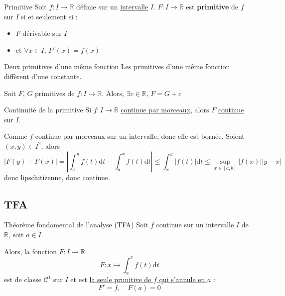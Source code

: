\begin{Definition}[colbacktitle=red!75!black]{Primitive}{}
Soit $f : I \to \mathbb{R}$ définie sur un \underline{intervalle} $I$. $F : I \to \mathbb{R}$ est \textbf{primitive} de $f$ sur $I$ si et seulement si :
\begin{itemize}

    \item $F$ dérivable sur $I$ 
    \item et $\forall x \in I$, $F'(x) = f(x)$

\end{itemize}
\end{Definition}

\begin{Prop}{Deux primitives d'une même fonction}{}
  Les primitives d'une même fonction diffèrent d'une constante.

Soit $F$, $G$ primitives de $f : I \to \mathbb{R}$. Alors, $\exists c \in \mathbb{R}$, $F = G + c$
\end{Prop}

\begin{Lenma}{Continuité de la primitive}{}
Si $f : I \to \mathbb{R}$ \underline{continue par morceaux}, alors $F$ \underline{continue} sur $I$.
\end{Lenma}

\begin{myproof}{}{}
  Comme $f$ continue par morceaux sur un intervalle, donc elle est bornée.
Soient $(x, y) \in I ^{2}$, alors 
\begin{equation}
  |F(y) - F(x) | = \left| \int_{a}^{y} f(t) \mathrm{d} t - \int_{a}^{x} f(t) \mathrm{d} t \right| \le \int_{x}^{y} |f(t) | \mathrm{d} t \le \sup _{x \in [a,b]} |f(x)| |y-x|
\end{equation}
donc lipschitizenne, donc continue.
\end{myproof}

\subsection{TFA} %
\label{sub:TFA}

\begin{Theorem}{\color{red} Théorème fondamental de l'analyse (TFA)}{}
Soit $f$ continue sur un intervalle $I$ de $\mathbb{R}$, soit $a \in I$. 

Alors, la fonction $F : I \to \mathbb{R}$
\begin{equation}
  F : x \mapsto \int_{a}^{x} f(t) \mathrm{d}t
\end{equation}
est de classe $\mathscr{C} ^{1}$ sur $I$ et est \underline{la seule primitive de $f$ qui s'annule en $a$} : 
\begin{equation}
  F' = f,\quad F(a) = 0
\end{equation}
\end{Theorem}

